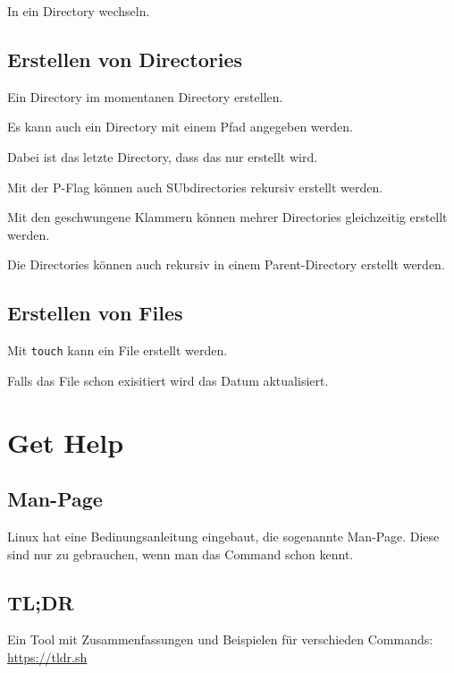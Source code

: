 \documentclass{article}
\begin{document}
In ein Directory wechseln.

\subsection{Erstellen von Directories}

Ein Directory im momentanen Directory erstellen.

Es kann auch ein Directory mit einem Pfad angegeben werden.

Dabei ist das letzte Directory, dass das nur erstellt wird.

Mit der P-Flag können auch SUbdirectories rekursiv erstellt werden.

Mit den geschwungene Klammern können mehrer Directories gleichzeitig erstellt werden.

Die Directories können auch rekursiv in einem Parent-Directory erstellt werden.

\subsection{Erstellen von Files}

Mit \texttt{touch} kann ein File erstellt werden.

Falls das File schon exisitiert wird das Datum aktualisiert.


\section{Get Help}
\subsection{Man-Page}
Linux hat eine Bedinungsanleitung eingebaut, die sogenannte Man-Page.
Diese sind nur zu gebrauchen, wenn man das Command schon kennt.

\subsection{TL;DR}
Ein Tool mit Zusammenfassungen und Beispielen für verschieden Commands: \href{https://tldr.sh/}{https://tldr.sh}
\end{document}
